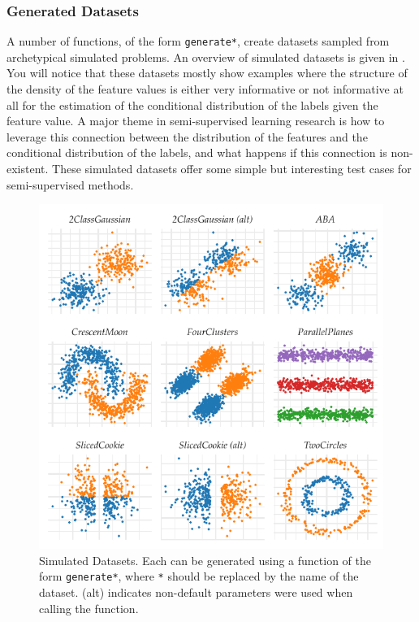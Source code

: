\documentclass[runningheads,a4paper]{llncs}\usepackage[]{graphicx}\usepackage[]{color}
\makeatletter
\def\maxwidth{ %
  \ifdim\Gin@nat@width>\linewidth
    \linewidth
  \else
    \Gin@nat@width
  \fi
}
\newenvironment{knitrout}{}{} %
\makeatother
\begin{document}
\subsubsection{Generated Datasets}
A number of functions, of the form \texttt{generate*}, create datasets sampled from archetypical simulated problems. An overview of simulated datasets is given in . You will notice that these datasets mostly show examples where the structure of the density of the feature values is either very informative or not informative at all for the estimation of the conditional distribution of the labels given the feature value. A major theme in semi-supervised learning research is how to leverage this connection between the distribution of the features and the conditional distribution of the labels, and what happens if this connection is non-existent. These simulated datasets offer some simple but interesting test cases for semi-supervised methods.
\begin{knitrout}
\color{fgcolor}\begin{figure}
\includegraphics[width=\maxwidth]{figure/generateddatasets-1} \caption[Simulated Datasets]{Simulated Datasets. Each can be generated using a function of the form \texttt{generate*}, where \texttt{*} should be replaced by the name of the dataset. (alt) indicates non-default parameters were used when calling the function.}\label{fig:generateddatasets}
\end{figure}


\end{knitrout}
\end{document}
